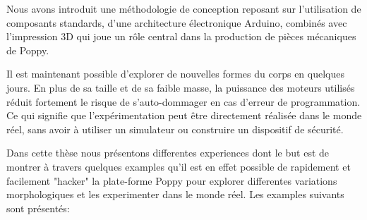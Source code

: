 Nous avons introduit une méthodologie de conception reposant sur l'utilisation de composants standards, d'une architecture électronique Arduino, combinés avec l'impression 3D qui joue un rôle central dans la production de pièces mécaniques de Poppy.

Il est maintenant possible d'explorer de nouvelles formes du corps en quelques jours. En plus de sa taille et de sa faible masse, la puissance des moteurs utilisés réduit fortement le risque de s'auto-dommager en cas d'erreur de programmation. Ce qui signifie que l'expérimentation peut être directement réalisée dans le monde réel, sans avoir à utiliser un simulateur ou construire un dispositif de sécurité.

Dans cette thèse nous présentons differentes experiences dont le but est de montrer à travers quelques examples qu'il est en effet possible de rapidement et facilement "hacker" la plate-forme Poppy pour explorer differentes variations morphologiques et les experimenter dans le monde réel. 
Les examples suivants sont présentés:
